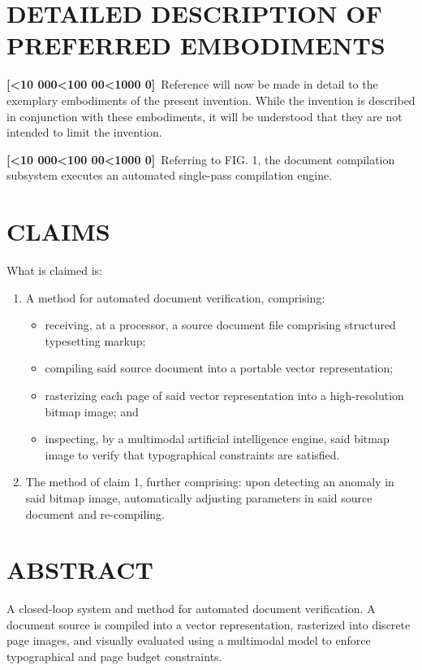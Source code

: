 \documentclass[12pt,letterpaper]{article}
\newcounter{patentpara}
\newcommand{\ppara}{\stepcounter{patentpara}\noindent\textbf{[\padzero{\thepatentpara}]}\ }
\newcommand{\padzero}[1]{\ifnum#1<10 000#1\else\ifnum#1<100 00#1\else\ifnum#1<1000 0#1\else#1\fi\fi\fi}
\begin{document}
\section*{DETAILED DESCRIPTION OF PREFERRED EMBODIMENTS}
\ppara Reference will now be made in detail to the exemplary embodiments of the present invention. While the invention is described in conjunction with these embodiments, it will be understood that they are not intended to limit the invention.

\ppara Referring to FIG. 1, the document compilation subsystem executes an automated single-pass compilation engine.

\section*{CLAIMS}
\noindent What is claimed is:

\begin{enumerate}
\item A method for automated document verification, comprising:
\begin{itemize}
\item receiving, at a processor, a source document file comprising structured typesetting markup;
\item compiling said source document into a portable vector representation;
\item rasterizing each page of said vector representation into a high-resolution bitmap image; and
\item inspecting, by a multimodal artificial intelligence engine, said bitmap image to verify that typographical constraints are satisfied.
\end{itemize}

\item The method of claim 1, further comprising:
upon detecting an anomaly in said bitmap image, automatically adjusting parameters in said source document and re-compiling.
\end{enumerate}

\newpage
\section*{ABSTRACT}
A closed-loop system and method for automated document verification. A document source is compiled into a vector representation, rasterized into discrete page images, and visually evaluated using a multimodal model to enforce typographical and page budget constraints.
\end{document}
